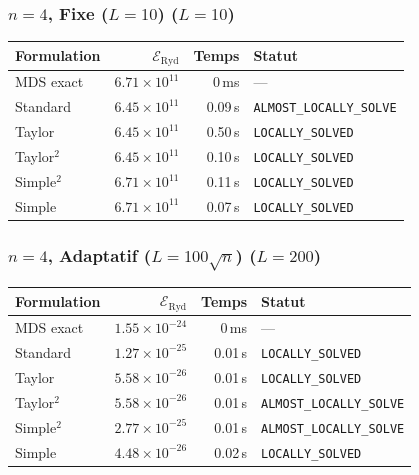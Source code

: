 \subsubsection{$n=4$, Fixe ($L{=}10$) ($L=10$)}
\begin{longtable}{@{}lrrl@{}}
  \toprule
  Formulation & $\mathcal{E}_{\mathrm{Ryd}}$ & Temps & Statut \\
  \midrule
  \endhead
  MDS exact & $6.71\times10^{11}$ & 0\,ms & --- \\
  Standard & $6.45\times10^{11}$ & 0.09\,s & \texttt{ALMOST\_LOCALLY\_SOLVE} \\
  Taylor & $6.45\times10^{11}$ & 0.50\,s & \texttt{LOCALLY\_SOLVED} \\
  Taylor$^2$ & $6.45\times10^{11}$ & 0.10\,s & \texttt{LOCALLY\_SOLVED} \\
  Simple$^2$ & $6.71\times10^{11}$ & 0.11\,s & \texttt{LOCALLY\_SOLVED} \\
  Simple & $6.71\times10^{11}$ & 0.07\,s & \texttt{LOCALLY\_SOLVED} \\
  \bottomrule
\end{longtable}

\subsubsection{$n=4$, Adaptatif ($L{=}100\sqrt{n}$) ($L=200$)}
\begin{longtable}{@{}lrrl@{}}
  \toprule
  Formulation & $\mathcal{E}_{\mathrm{Ryd}}$ & Temps & Statut \\
  \midrule
  \endhead
  MDS exact & $1.55\times10^{-24}$ & 0\,ms & --- \\
  Standard & $1.27\times10^{-25}$ & 0.01\,s & \texttt{LOCALLY\_SOLVED} \\
  Taylor & $5.58\times10^{-26}$ & 0.01\,s & \texttt{LOCALLY\_SOLVED} \\
  Taylor$^2$ & $5.58\times10^{-26}$ & 0.01\,s & \texttt{ALMOST\_LOCALLY\_SOLVE} \\
  Simple$^2$ & $2.77\times10^{-25}$ & 0.01\,s & \texttt{ALMOST\_LOCALLY\_SOLVE} \\
  Simple & $4.48\times10^{-26}$ & 0.02\,s & \texttt{LOCALLY\_SOLVED} \\
  \bottomrule
\end{longtable}

